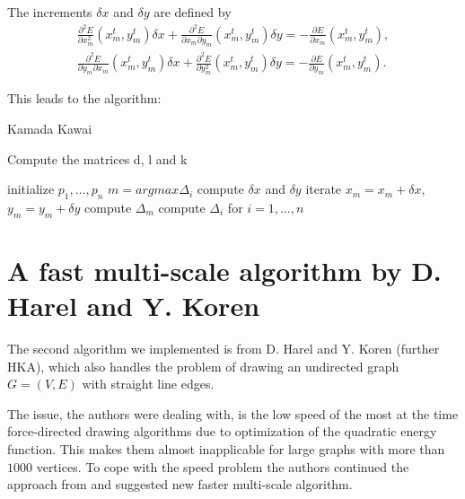 \documentclass[12pt,a4paper]{article}
\begin{document}
The increments $\delta x$ and $\delta y$ are defined by
\begin{equation}
\label{NR_iteration}
\begin{aligned}
	\frac{\partial^2 E}{\partial x_m^2}(x_m^t,y_m^t) \delta x + \frac{\partial^2 E}{\partial x_m \partial y_m}(x_m^t,y_m^t) \delta y = - \frac{ \partial E}{\partial x_m} (x_m^t,y_m^t),\\	
	\frac{\partial^2 E}{\partial y_m \partial x_m}(x_m^t,y_m^t) \delta x + \frac{\partial^2 E}{\partial y_m^2}(x_m^t,y_m^t) \delta y = - \frac{ \partial E}{\partial y_m} (x_m^t,y_m^t).
\end{aligned}
\end{equation}

This leads to the algorithm:

\begin{algorithm}
\caption{Kamada Kawai \cite{TomihisaKamada1989}}
\label{KKA}
\begin{algorithmic}[1]
\item Compute the matrices d, l and k
\item initialize $p_1 , \dots, p_n$ 
	\State $ m = argmax \Delta_i $
		\State compute $\delta x$ and $\delta y$
		\State iterate $x_m = x_m + \delta x$, $y_m = y_m + \delta y$
		\State compute $\Delta_m$
	\EndWhile
	\State compute $\Delta_i$ for $i=1, \dots, n$
\EndWhile
\end{algorithmic}

\end{algorithm}

\newpage

\section{A fast multi-scale algorithm by D. Harel and Y. Koren}
\label{section2}

The second algorithm we implemented is from D. Harel and Y. Koren \cite{DavidHarel2002} (further HKA), which also handles the problem of drawing an undirected graph $G=(V,E)$ with straight line edges.

The issue, the authors were dealing with, is the low speed of the most at the time force-directed drawing algorithms due to optimization of the quadratic energy function. This makes them almost inapplicable for large graphs with more than $1000$ vertices. To cope with the speed problem the authors continued the approach from \cite{HadanyHarel2001} and suggested new faster multi-scale algorithm.
\end{document}
